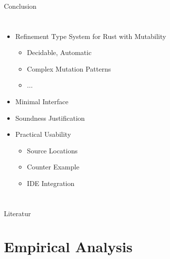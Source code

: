 \documentclass{sdqbeamer}
\begin{document}
\begin{frame}{Conclusion}
  \begin{columns}
    \begin{itemize}
      \item Refinement Type System for Rust with Mutability
      \begin{itemize}
        \item Decidable, Automatic
        \item Complex Mutation Patterns
        \item ...
      \end{itemize}
      \item Minimal Interface
      \item Soundness Justification
      \item Practical Usability
      \begin{itemize}
        \item Source Locations
        \item Counter Example
        \item IDE Integration
      \end{itemize}
    \end{itemize}

  \end{columns}
\end{frame}

\begin{frame}
 

\end{frame}


\appendix

\beginbackup


\begin{frame}[allowframebreaks]{Literatur}
  \tiny{
    \printbibliography
  }
\end{frame}



\section{Empirical Analysis}
\end{document}
